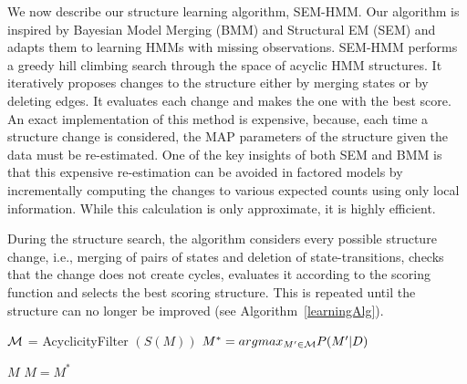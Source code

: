 \documentclass[letterpaper]{article}
\begin{document}
We now describe our structure learning algorithm, SEM-HMM.  Our algorithm is inspired by Bayesian Model Merging (BMM) \cite{stolcke1994best} and Structural EM (SEM) \cite{friedman1998bayesian} and adapts them to learning HMMs with missing observations.
SEM-HMM performs a greedy hill climbing search through the space of acyclic
HMM structures. It iteratively proposes changes to the structure either
by merging states or by deleting edges. It evaluates each change and makes the one with the best score.
An exact implementation of this method is expensive, because, each time a structure change is considered, the MAP parameters of the structure given the data must be re-estimated.
One of the key insights of both SEM and BMM is that this expensive
re-estimation can be avoided in factored models by incrementally
computing the changes to various expected counts using only local
information. While this calculation is only approximate, it is highly
efficient.


During the structure search, the algorithm considers every possible structure change, i.e., merging of pairs of states and deletion of state-transitions, checks that the change does not create cycles, evaluates it according to the scoring function and selects the best scoring structure. This is repeated until the structure can no longer be improved (see Algorithm~\ref{learningAlg}).

\begin{algorithm}
\footnotesize
\begin{algorithmic}

\State ${\cal M}$ = AcyclicityFilter $(S(M))$
\State $M^* = argmax_{M^\prime \in {\cal M}} P(M^\prime|D)$

\State \Return $M$
\Else
\State $M = M^*$
\EndIf

\EndWhile
\EndProcedure
\end{algorithmic}
\caption{}
\label{learningAlg}
\end{algorithm}
\end{document}

